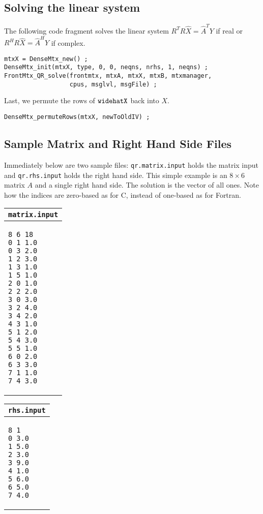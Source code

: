 \subsection{Solving the linear system}
\label{subsection:QR:solve}
\par
The following code fragment solves the linear system 
$R^T R {\widehat X} = {\widehat A}^T Y$ if real
or
$R^H R {\widehat X} = {\widehat A}^H Y$ if complex.
\begin{verbatim}
mtxX = DenseMtx_new() ;
DenseMtx_init(mtxX, type, 0, 0, neqns, nrhs, 1, neqns) ;
FrontMtx_QR_solve(frontmtx, mtxA, mtxX, mtxB, mtxmanager,
                  cpus, msglvl, msgFile) ;
\end{verbatim}
Last, we permute the rows of ${\tt widehat X}$ back into $X$.
\begin{verbatim}
DenseMtx_permuteRows(mtxX, newToOldIV) ;
\end{verbatim}
\par
\subsection{Sample Matrix and Right Hand Side Files}
\label{subsection:QR:input-files}
\par
Immediately below are two sample files:
{\tt qr.matrix.input} holds the matrix input
and {\tt qr.rhs.input} holds the right hand side.
This simple example is an $8 \times 6$ matrix $A$
and a single right hand side.
The solution is the vector of all ones.
Note how the indices are zero-based as for C, instead of one-based
as for Fortran.
\begin{center}
\begin{tabular}{|l|}
\multicolumn{1}{c}{\tt matrix.input} \\ \hline
\begin{minipage}[t]{0.5 in}
\begin{verbatim}
8 6 18
0 1 1.0
0 3 2.0
1 2 3.0
1 3 1.0
1 5 1.0
2 0 1.0
2 2 2.0
3 0 3.0
3 2 4.0
3 4 2.0
4 3 1.0
5 1 2.0
5 4 3.0
5 5 1.0
6 0 2.0
6 3 3.0
7 1 1.0
7 4 3.0
\end{verbatim}
\end{minipage}
\\ \hline
\end{tabular}
\qquad
\begin{tabular}{|l|}
\multicolumn{1}{c}{\tt rhs.input} \\ \hline
\begin{minipage}[t]{0.5 in}
\begin{verbatim}
8 1
0 3.0
1 5.0
2 3.0
3 9.0
4 1.0
5 6.0
6 5.0
7 4.0
\end{verbatim}
\end{minipage}
\\ \hline
\end{tabular}
\end{center}
\par
